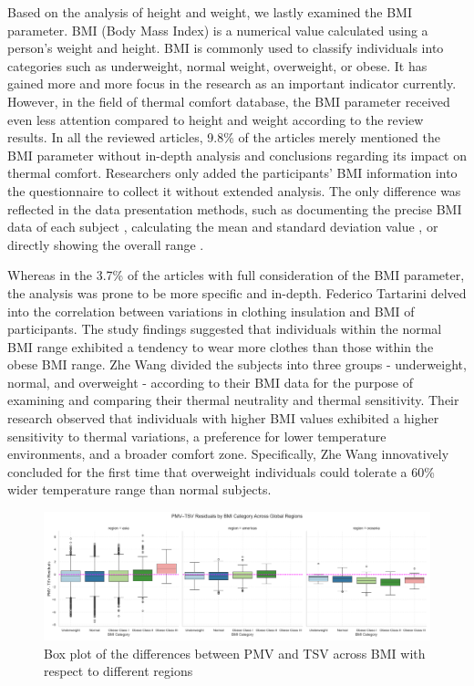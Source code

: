 \documentclass[final,3p,times,12pt]{elsarticle}
\begin{document}
Based on the analysis of height and weight, we lastly examined the BMI parameter. BMI (Body Mass Index) is a numerical value calculated using a person's weight and height. BMI is commonly used to classify individuals into categories such as underweight, normal weight, overweight, or obese. It has gained more and more focus in the research as an important indicator currently. However, in the field of thermal comfort database, the BMI parameter received even less attention compared to height and weight according to the review results. In all the reviewed articles, 9.8\% of the articles merely mentioned the BMI parameter without in-depth analysis and conclusions regarding its impact on thermal comfort. Researchers only added the participants' BMI information into the questionnaire to collect it without extended analysis. The only difference was reflected in the data presentation methods, such as documenting the precise BMI data of each subject \cite{jiaThermalComfortMixedmode2020}, calculating the mean and standard deviation value \cite{xuEnvironmentalFactorsAffecting2021}, or directly showing the overall range \cite{hawighorstThermospecificSelfefficacySpecSE2016,zhangThermalComfortPeople2020}. 

Whereas in the 3.7\% of the articles with full consideration of the BMI parameter, the analysis was prone to be more specific and in-depth. Federico Tartarini \cite{tartariniThermalPerceptionsPreferences2018} delved into the correlation between variations in clothing insulation and BMI of participants. The study findings suggested that individuals within the normal BMI range exhibited a tendency to wear more clothes than those within the obese BMI range. Zhe Wang \cite{wangRevisitingIndividualGroup2020a} divided the subjects into three groups - underweight, normal, and overweight - according to their BMI data for the purpose of examining and comparing their thermal neutrality and thermal sensitivity. Their research observed that individuals with higher BMI values exhibited a higher sensitivity to thermal variations, a preference for lower temperature environments, and a broader comfort zone. Specifically, Zhe Wang \cite{wangRevisitingIndividualGroup2020a} innovatively concluded for the first time that overweight individuals could tolerate a 60\% wider temperature range than normal subjects.

\begin{figure}[h!]
    \centering
    \includegraphics[width=1.0\linewidth]{facet_bmi_residuals_new.png}
    \caption{Box plot of the differences between PMV and TSV across BMI with respect to different regions}
    \label{7}
\end{figure}
\end{document}
